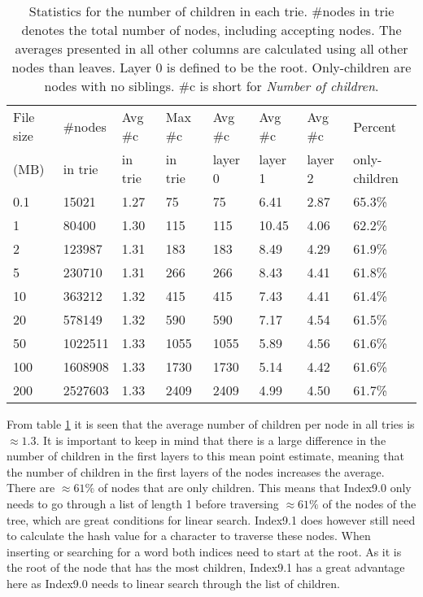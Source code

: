 \begin{table}[ht!]
\centering
\begin{tabular}{l|lllllll}
 File size & \#nodes      & Avg \#c  & Max \#c  & Avg \#c & Avg \#c & Avg \#c & Percent          \\
 (MB)     & in trie     & in trie  &  in trie  & layer 0 & layer 1 & layer 2 & only-children   \\\hline
 0.1      & 15021   & 1.27 & 75   & 75       & 6.41     & 2.87     & 65.3\%                   \\
 1        & 80400   & 1.30 & 115  & 115      & 10.45    & 4.06     & 62.2\%             \\
 2        & 123987  & 1.31 & 183  & 183      & 8.49     & 4.29     & 61.9\%             \\
 5        & 230710  & 1.31 & 266  & 266      & 8.43     & 4.41     & 61.8\%             \\
 10       & 363212  & 1.32 & 415  & 415      & 7.43     & 4.41     & 61.4\%             \\
 20       & 578149  & 1.32 & 590  & 590      & 7.17     & 4.54     & 61.5\%             \\
 50       & 1022511 & 1.33 & 1055 & 1055     & 5.89     & 4.56     & 61.6\%             \\
 100      & 1608908 & 1.33 & 1730 & 1730     & 5.14     & 4.42     & 61.6\%             \\
 200      & 2527603 & 1.33 & 2409 & 2409     & 4.99     & 4.50     & 61.7\%             \\
\end{tabular}
\caption{Statistics for the number of children in each trie. \#nodes in trie denotes the total number of nodes, including accepting nodes. The averages presented in all other columns are calculated using all other nodes than leaves. Layer 0 is defined to be the root. Only-children are nodes with no siblings. \#c is short for \textit{Number of children}. }
\label{tab:triecount}
\end{table}

From table  \ref{tab:triecount} it is seen that the average number of children per node in all tries is $\approx 1.3$. It is important to keep in mind that there is a large difference in the number of children in the first layers to this mean point estimate, meaning that the number of children in the first layers of the nodes increases the average.  There are $\approx 61\%$ of nodes that are only children. This means that Index9.0 only needs to go through a list of length 1 before traversing $\approx 61\%$ of the nodes of the tree, which are great conditions for linear search. Index9.1 does however still need to calculate the hash value for a character to traverse these nodes. When inserting or searching for a word both indices need to start at the root. As it is the root of the node that has the most children, Index9.1 has a great advantage here as Index9.0 needs to linear search through the list of children.

